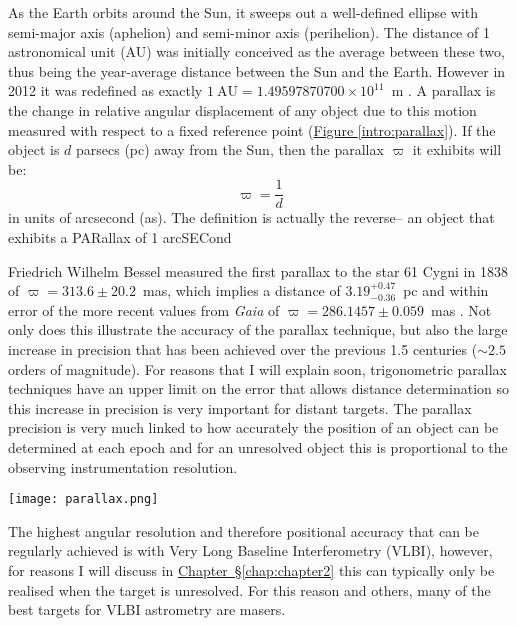 			As the Earth orbits around the Sun, it sweeps out a well-defined ellipse with semi-major axis (aphelion) and semi-minor axis (perihelion). The distance of 1 astronomical unit (AU) was initially conceived as the average between these two, thus being the year-average distance between the Sun and the Earth. However in 2012 it was redefined as exactly $1~\text{AU}=1.49597870700\times10^{11}$~m \citep{Capitaine2012}. A parallax is the change in relative angular displacement of any object due to this motion measured with respect to a fixed reference point (\hyperref[intro:parallax]{Figure \ref*{intro:parallax}}). %
			If the object is $d$ parsecs (pc) away from the Sun, then the parallax $\varpi$ it exhibits will be:
			\begin{equation}
				\varpi=\frac{1}{d}
			\end{equation} in units of arcsecond (as). The definition is actually the reverse-- an object that exhibits a PARallax of 1 arcSECond
			
			Friedrich Wilhelm Bessel measured the first parallax to the star 61 Cygni in 1838 of $\varpi=313.6\pm20.2$~mas, which implies a distance of $3.19^{+0.47}_{-0.36}$~pc and within error of the more recent values from {\it Gaia} of $\varpi=286.1457\pm0.059$~mas \citep{Gaia2018}. Not only does this illustrate the accuracy of the parallax technique, but also the large increase in precision that has been achieved over the previous 1.5 centuries ($\sim2.5$ orders of magnitude). For reasons that I will explain soon, trigonometric parallax techniques have an upper limit on the error that allows distance determination so this increase in precision is very important for distant targets. The parallax precision is very much linked to how accurately the position of an object can be determined at each epoch and for an unresolved object this is proportional to the observing instrumentation resolution. 
			\begin{SCfigure}
				\centering
				\texttt{[image: parallax.png]}
				\caption[Schematic of Trigonometric Parallax]{Simplified schematic of trigonometric parallax for a target source very close to the North Ecliptic Pole. The parallax $\varpi$ is half the total angle subtended by the Earth as it orbits the Sun when $d\gg1$\,AU relative to some stationary background.}
				\label{intro:parallax}
			\end{SCfigure}				         
			The highest angular resolution and therefore positional accuracy that can be regularly achieved is with Very Long Baseline Interferometry (VLBI), however, for reasons I will discuss in \hyperref[chap:chapter2]{Chapter~\S\ref*{chap:chapter2}} this can typically only be realised when the target is unresolved. For this reason and others, many of the best targets for VLBI astrometry are masers.
		
